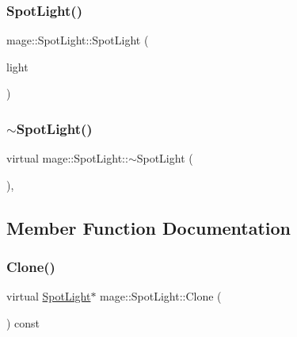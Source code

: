 \hypertarget{classmage_1_1_spot_light_a404e8f8f37100bff11042831ff22fe8f}{}\label{classmage_1_1_spot_light_a404e8f8f37100bff11042831ff22fe8f} 
\subsubsection{\texorpdfstring{Spot\+Light()}{SpotLight()}\hspace{0.1cm}{\footnotesize\ttfamily [3/3]}}
{\footnotesize\ttfamily mage\+::\+Spot\+Light\+::\+Spot\+Light (\begin{DoxyParamCaption}\item[{\hyperlink{classmage_1_1_spot_light}{Spot\+Light} \&\&}]{light }\end{DoxyParamCaption})\hspace{0.3cm}{\ttfamily [default]}}

\hypertarget{classmage_1_1_spot_light_a924dd88ca89b3064d6cfce546eab322a}{}\label{classmage_1_1_spot_light_a924dd88ca89b3064d6cfce546eab322a} 
\subsubsection{\texorpdfstring{$\sim$\+Spot\+Light()}{~SpotLight()}}
{\footnotesize\ttfamily virtual mage\+::\+Spot\+Light\+::$\sim$\+Spot\+Light (\begin{DoxyParamCaption}{ }\end{DoxyParamCaption})\hspace{0.3cm}{\ttfamily [virtual]}, {\ttfamily [default]}}



\subsection{Member Function Documentation}
\hypertarget{classmage_1_1_spot_light_a3ec29a2a0edbd1f8fd7e76ba93d6c972}{}\label{classmage_1_1_spot_light_a3ec29a2a0edbd1f8fd7e76ba93d6c972} 
\subsubsection{\texorpdfstring{Clone()}{Clone()}}
{\footnotesize\ttfamily virtual \hyperlink{classmage_1_1_spot_light}{Spot\+Light}$\ast$ mage\+::\+Spot\+Light\+::\+Clone (\begin{DoxyParamCaption}{ }\end{DoxyParamCaption}) const\hspace{0.3cm}{\ttfamily [virtual]}}



